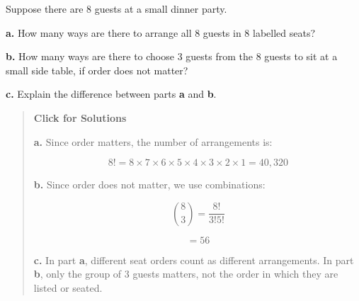 \documentclass[
  letterpaper,
  DIV=11,
  numbers=noendperiod]{scrreprt}
\begin{document}
\begin{tcolorbox}[enhanced jigsaw, arc=.35mm, bottomrule=.15mm, bottomtitle=1mm, breakable, colback=white, colbacktitle=quarto-callout-note-color!10!white, colframe=quarto-callout-note-color-frame, coltitle=black, left=2mm, leftrule=.75mm, opacityback=0, opacitybacktitle=0.6, rightrule=.15mm, title=\textcolor{quarto-callout-note-color}{\faInfo}\hspace{0.5em}{Question 10}, titlerule=0mm, toprule=.15mm, toptitle=1mm]

Suppose there are 8 guests at a small dinner party.

\textbf{a.} How many ways are there to arrange all 8 guests in 8
labelled seats?

\textbf{b.} How many ways are there to choose 3 guests from the 8 guests
to sit at a small side table, if order does not matter?

\textbf{c.} Explain the difference between parts \textbf{a} and
\textbf{b}.

\begin{quote}
\textbf{Click for Solutions}

\textbf{a.} Since order matters, the number of arrangements is:

\[
8! = 8\times7\times6\times5\times4\times3\times2\times1 = 40{,}320
\]

\textbf{b.} Since order does not matter, we use combinations:

\[
\binom{8}{3} = \frac{8!}{3!5!}
\]

\[
= 56
\]

\textbf{c.} In part \textbf{a}, different seat orders count as different
arrangements. In part \textbf{b}, only the group of 3 guests matters,
not the order in which they are listed or seated.
\end{quote}

\end{tcolorbox}
\end{document}
